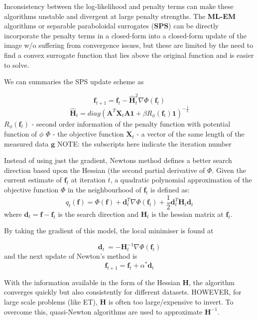 \documentclass{article}
\begin{document}
Inconsistency between the log-likelihood and penalty terms can make these algorithms unstable and divergent at large penalty strengths. The \textbf{ML-EM} algorithms or separable paraboloidal surrogates (\textbf{SPS}) can be directly incorporate the penalty terms in a closed-form into a closed-form update of the image w/o suffering from convergence issues, but these are limited by the need to find a convex surrogate function that lies above the original function and is easier to solve.

We can summaries the SPS update scheme as 

\[ \textbf{f}_{t+1} = \textbf{f}_t - \hat{\textbf{H}}_t^2 \nabla \Phi(\textbf{f}_t)\]
\[\hat{\textbf{H}}_t = diag(\textbf{A}^T \textbf{X}_t \textbf{A}\textbf{1} +\beta R_\phi (\textbf{f}_t)\textbf{1})^{-\frac{1}{2}}\]
$R_\phi (\textbf{f}_t)$ - second order information of the penalty function with potential function of $\phi$  
$\Phi$ - the objective function
$\textbf{X}_t$  - a vector of the same length of the measured data $\textbf{g}$ 
NOTE: the subscripts here indicate the iteration number

Instead of using just the gradient, Newtons method defines a better search direction based upon the Hessian (the second partial derivative of $\Phi$. Given the current estimate of $\textbf{f}_t$ at iteration $t$, a quadratic polynomial approximation of the objective function $\Phi$ in the neighbourhood of $\textbf{f}_t$ is defined as:
\[q_t(\textbf{f}) = \Phi(\textbf{f}) + \textbf{d}_t^T \nabla \Phi (\textbf{f}_t) +\frac{1}{2} \textbf{d}_t^T \textbf{H}_t \textbf{d}_t\]
where $\textbf{d}_t = \textbf{f} - \textbf{f}_t $ is the search direction and $\textbf{H}_t $ is the hessian matrix at $\textbf{f}_t$.

By taking the gradient of this model, the local minimiser is found at 

\[\textbf{d}_t\ = -\textbf{H}_t^{-1} \nabla\Phi(\textbf{f}_t) \]
and the next update of Newton's method is
\[
\textbf{f}_{t+1} = \textbf{f}_t + \alpha^* \textbf{d}_t
 \]


With the information available in the form of the Hessian $\textbf{H}$, the algorithm converges quickly but also consistently for different datasets. HOWEVER, for large scale problems (like ET), $\textbf{H}$ is often too large/expensive to invert. To overcome this, quasi-Newton algorithms are used to approximate $\textbf{H}^{-1}$.
\end{document}

